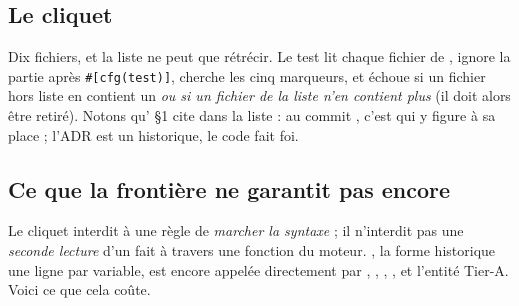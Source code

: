 \subsection{Le cliquet}


Dix fichiers, et la liste ne peut que rétrécir. Le test lit chaque fichier de , ignore la partie après \texttt{\#[cfg(test)]}, cherche les cinq marqueurs, et échoue si un fichier hors liste en contient un \emph{ou si un fichier de la liste n'en contient plus} (il doit alors être retiré). Notons qu' §1 cite  dans la liste : au commit \snapshotCommit{}, c'est  qui y figure à sa place ; l'ADR est un historique, le code fait foi.

\subsection{Ce que la frontière ne garantit pas encore}

Le cliquet interdit à une règle de \emph{marcher la syntaxe} ; il n'interdit pas une \emph{seconde lecture} d'un fait à travers une fonction du moteur. , la forme historique \og une ligne par variable\fg{}, est encore appelée directement par , , , ,  et l'entité Tier-A. Voici ce que cela coûte.

